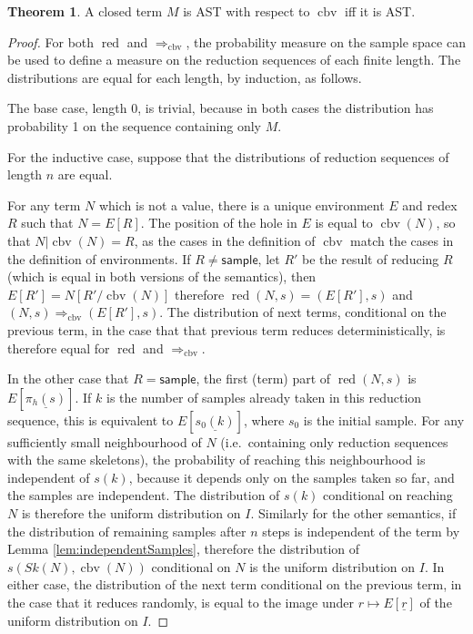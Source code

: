 \documentclass{article}
\newcommand{\tsample}{\mathsf{sample}}
\DeclareMathOperator{\red}{red}
\DeclareMathOperator{\cbv}{cbv}
\theoremstyle{definition}
\theoremstyle{lemma}
\newtheorem{theorem}{Theorem}
\theoremstyle{remark}
\begin{document}
\begin{theorem} \label{thm:AstEquivalence}
A closed term $M$ is AST with respect to $\cbv$ iff it is AST.
\end{theorem}
\begin{proof}

For both $\red$ and $\Rightarrow_{\cbv}$, the probability measure on the sample space can be used to define a measure on the reduction sequences of each finite length. The distributions are equal for each length, by induction, as follows.

The base case, length 0, is trivial, because in both cases the distribution has probability 1 on the sequence containing only $M$.

For the inductive case, suppose that the distributions of reduction sequences of length $n$ are equal. 

For any term $N$ which is not a value, there is a unique environment $E$ and redex $R$ such that $N = E[R]$. The position of the hole in $E$ is equal to $\cbv(N)$, so that $N|\cbv(N) = R$, as the cases in the definition of $\cbv$ match the cases in the definition of environments. If $R \neq \tsample$, let $R'$ be the result of reducing $R$ (which is equal in both versions of the semantics), then $E[R'] = N[R' / \cbv(N)]$ therefore $\red(N,s) = (E[R'],s)$ and $(N,s) \Rightarrow_{\cbv} (E[R'],s)$. The distribution of next terms, conditional on the previous term, in the case that that previous term reduces deterministically, is therefore equal for $\red$ and $\Rightarrow_{\cbv}$.

In the other case that $R = \tsample$, the first (term) part of $\red(N,s)$ is $E[\underline{\pi_h(s)}]$. If $k$ is the number of samples already taken in this reduction sequence, this is equivalent to $E[\underline{s_0(k)}]$, where $s_0$ is the initial sample. For any sufficiently small neighbourhood of $N$ (i.e.~containing only reduction sequences with the same skeletons), the probability of reaching this neighbourhood is independent of $s(k)$, because it depends only on the samples taken so far, and the samples are independent. The distribution of $s(k)$ conditional on reaching $N$ is therefore the uniform distribution on $I$. Similarly for the other semantics, if the distribution of remaining samples after $n$ steps is independent of the term by Lemma \ref{lem:independentSamples}, therefore the distribution of $s(Sk(N),\cbv(N))$ conditional on $N$ is the uniform distribution on $I$. In either case, the distribution of the next term conditional on the previous term, in the case that it reduces randomly, is equal to the image under $r \mapsto E[\underline r]$ of the uniform distribution on $I$.


\end{proof}
\end{document}
